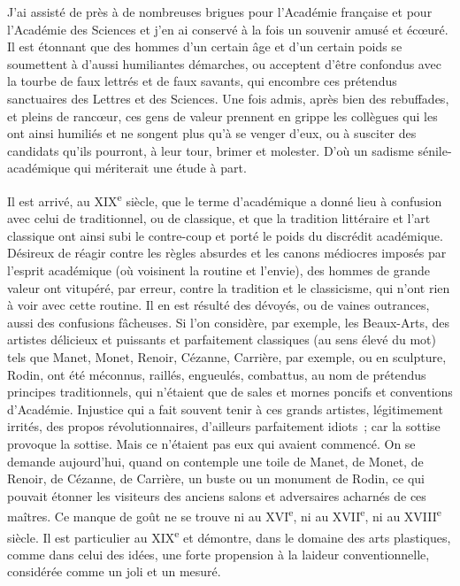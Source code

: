 \documentclass[french,twoside]{book} %
\begin{document}
J’ai assisté de près à de nombreuses brigues pour l’Académie française et pour l’Académie des Sciences et j’en ai conservé à la fois un souvenir amusé et écœuré. Il est étonnant que des hommes d’un certain âge et d’un certain poids se soumettent à d’aussi humiliantes démarches, ou acceptent d’être confondus avec la tourbe de faux lettrés et de faux savants, qui encombre ces prétendus sanctuaires des Lettres et des Sciences. Une fois admis, après bien des rebuffades, et pleins de rancœur, ces gens de valeur prennent en grippe les collègues qui les ont ainsi humiliés et ne songent plus qu’à se venger d’eux, ou à susciter des candidats qu’ils pourront, à leur tour, brimer et molester. D’où un sadisme sénile-académique qui mériterait une étude à part.\par
Il est arrivé, au XIX\textsuperscript{e} siècle, que le terme d’académique a donné lieu à confusion avec celui de traditionnel, ou de classique, et que la tradition littéraire et l’art classique ont ainsi subi le contre-coup et porté le poids du discrédit académique. Désireux de réagir contre les règles absurdes et les canons médiocres imposés par l’esprit académique (où voisinent la routine et l’envie), des hommes de grande valeur ont vitupéré, par erreur, contre la tradition et le classicisme, qui n’ont rien à voir avec cette routine. Il en est résulté des dévoyés, ou de vaines outrances, aussi des confusions fâcheuses. Si l’on considère, par exemple, les Beaux-Arts, des artistes délicieux et puissants et parfaitement classiques (au sens élevé du mot) tels que Manet, Monet, Renoir, Cézanne, Carrière, par exemple, ou en sculpture, Rodin, ont été méconnus, raillés, engueulés, combattus, au nom de prétendus principes traditionnels, qui n’étaient que de sales et mornes poncifs et conventions d’Académie. Injustice qui a fait souvent tenir à ces grands artistes, légitimement irrités, des propos révolutionnaires, d’ailleurs parfaitement idiots ; car la sottise provoque la sottise. Mais ce n’étaient pas eux qui avaient commencé. On se demande aujourd’hui, quand on contemple une toile de Manet, de Monet, de Renoir, de Cézanne, de Carrière, un buste ou un monument de Rodin, ce qui pouvait étonner les visiteurs des anciens salons et adversaires acharnés de ces maîtres. Ce manque de goût ne se trouve ni au XVI\textsuperscript{e}, ni au XVII\textsuperscript{e}, ni au XVIII\textsuperscript{e} siècle. Il est particulier au XIX\textsuperscript{e} et démontre, dans le domaine des arts plastiques, comme dans celui des idées, une forte propension à la laideur conventionnelle, considérée comme un joli et un mesuré.\par
\end{document}
